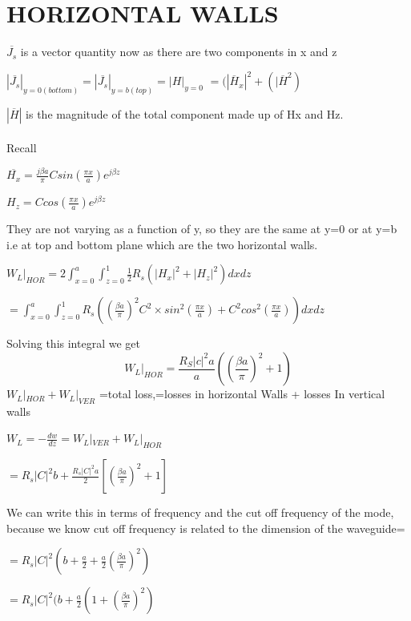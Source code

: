 \section{HORIZONTAL WALLS} 
$\overline{J_s}$ is a vector  quantity  now as there are two  components in x and z
\begin{center}
$|\overline{J_s}|_{y=0(bottom)} = |\overline{J_s}|_{y=b(top)} = |H|_{y=0}$
$=(|\overline{H}_x|^2 + (|\overline{H}^2 )$
\end{center}
$|\overline{H}|$ is the magnitude  of the total component made up of Hx and Hz.\\\\

Recall
\begin{center}
$\overline{H_x} = \frac{j\beta a}{\pi}Csin(\frac{\pi x}{a})e^{j\beta z}$
\end{center}
\begin{center}
$H_z=Ccos(\frac{\pi x}{a})e^{j\beta z}$
\end{center}
They are not varying as a function of y, so they are the same at y=0 or at y=b i.e at top and bottom  plane which are the two horizontal walls.
\begin{center}
$W_L|_{HOR} = 2\int_{x=0}^{a}\int_{z=0}^{1}\frac{1}{2}R_s(|H_x|^2 + |H_z|^2)dxdz$
\end{center}
\begin{center}
$=\int_{x=0}^{a}\int_{z=0}^{1}R_s ((\frac{\beta a}{\pi})^2C^2 \times sin^2(\frac{\pi x}{a})+ C^2cos^2(\frac{\pi x}{a}))dxdz$	
\end{center}
Solving  this integral we get
\begin{equation}
W_L|_{HOR} = \frac{R_S|c|^2 a}{a}\left(\left(\frac{\beta a}{\pi}\right)^2 +1\right)
\end{equation}
$W_L|_{HOR} + W_L|_{VER}$ =total loss,=losses in horizontal Walls + losses In vertical walls
\begin{center}
$W_L=-\frac{dw}{dz}=W_L|_{VER}+W_L|_{HOR}$	
\end{center}
\begin{center}
$=R_s|C|^2b+\frac{R_s|C|^2a}{2}[(\frac{\beta a}{\pi})^2+1]$	
\end{center}
We can write this in terms of frequency and the cut off frequency of the mode, because we know cut off frequency  is related to the dimension of the waveguide=
\begin{center}
$=R_s|C|^2 (b + \frac{a}{2} + \frac{a}{2}(\frac{\beta a}{\pi})^2)$	
\end{center}
\begin{center}
$ =R_s|C|^2(b+\frac{a}{2}(1+(\frac{\beta a}{\pi})^2)$	
\end{center}
